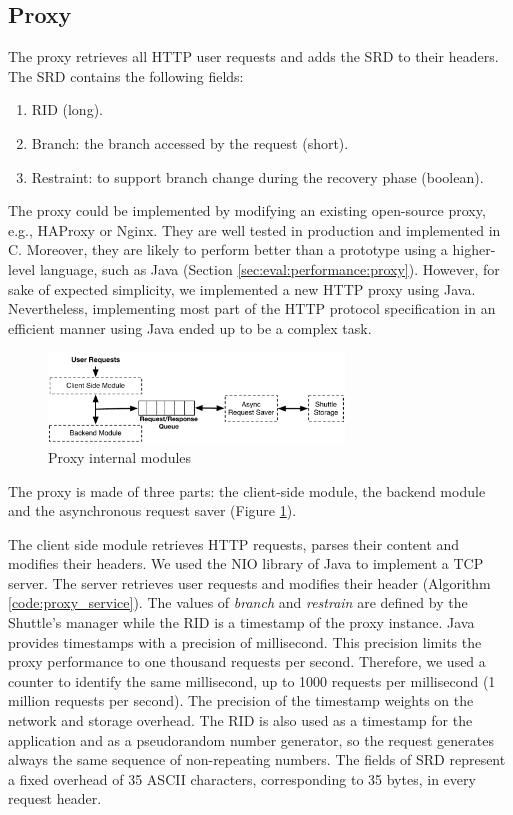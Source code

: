 \subsection{Proxy}\label{sec:impl:normal:proxy}
The proxy retrieves all \ac{HTTP} user requests and adds the \ac{SRD} to their headers. The \ac{SRD} contains the following fields:
\begin{enumerate}
	\item \acf{RID} (long).
	\item Branch: the branch accessed by the request (short).
	\item Restraint: to support branch change during the recovery phase (boolean).
\end{enumerate}

The proxy could be implemented by modifying an existing open-source proxy, e.g., HAProxy or Nginx. They are well tested in production and implemented in C. Moreover, they are likely to perform better than a prototype using a higher-level language, such as Java (Section \ref{sec:eval:performance:proxy}). However, for sake of expected simplicity, we implemented a new \ac{HTTP} proxy using Java. Nevertheless, implementing most part of the \ac{HTTP} protocol specification in an efficient manner using Java ended up to be a complex task.


\begin{figure}
  \centering
  \includegraphics[width=0.7\textwidth]{arch/proxy}
  \caption{Proxy internal modules}
  \label{fig:impl:proxy_modules}
\end{figure}

The proxy is made of three parts: the client-side module, the backend module and the asynchronous request saver (Figure \ref{fig:impl:proxy_modules}).

The client side module retrieves \ac{HTTP} requests, parses their content and modifies their headers. We used the \ac{NIO} library of Java to implement a TCP server. The server retrieves user requests and modifies their header (Algorithm \ref{code:proxy_service}). The values of \emph{branch} and \emph{restrain} are defined by the Shuttle's manager while the \ac{RID} is a timestamp of the proxy instance. Java provides timestamps with a precision of millisecond. This precision limits the proxy performance to one thousand requests per second. Therefore, we used a counter to identify the same millisecond, up to 1000 requests per millisecond (1 million requests per second). The precision of the timestamp weights on the network and storage overhead. The \ac{RID} is also used as a timestamp for the application and as a pseudorandom number generator, so the request generates always the same sequence of non-repeating numbers. The fields of \acf{SRD} represent a fixed overhead of 35 ASCII characters, corresponding to 35 bytes, in every request header.


